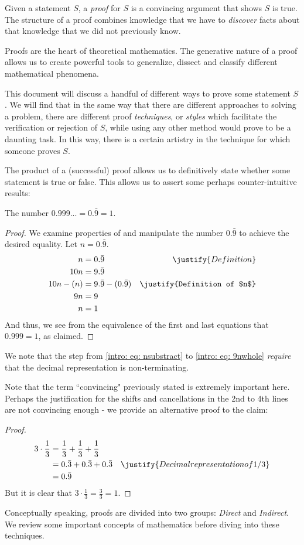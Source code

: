 \documentclass[../proofs.tex]{subfiles}
\begin{document}
Given a statement $S$, a \emph{proof} for $S$ is a convincing argument that shows $S$ is true.
The structure of a proof combines knowledge that we have to \emph{discover} facts about that knowledge
that we did not previously know.

Proofs are the heart of theoretical mathematics. The generative nature of a proof
allows us to create powerful tools to generalize, dissect and classify different
mathematical phenomena.

This document will discuss a handful of different ways to prove some statement $S$.
We will find that in the same way that there are different approaches to solving a
problem, there are different proof \emph{techniques}, or \emph{styles} which
facilitate the verification or rejection of $S$, while using any other method would
prove to be a daunting task. In this way, there is a certain artistry in the
technique for which someone proves $S$.

The product of a (successful) proof allows us to definitively state whether some
statement is true or false. This allows us to assert some perhaps counter-intuitive results:
\begin{claim}
  The number $0.999... = 0.\bar{9} = 1$.
  \begin{proof}
    We examine properties of and manipulate the number $0.\bar{9}$ to achieve the desired
    equality. Let $n = 0.\bar{9}$.
    \begin{align}
       n  &= 0.\bar{9} & \justify{Definition}                             \\
       10n &= 9.\bar{9}   											                          \\
       10n - (n) &= 9.\bar{9} - (0.\bar{9}) & \justify{Definition of $n$} \label{intro: eq: nsubstract} \\
       9n &= 9                                                            \label{intro: eq: 9nwhole}\\
        n &= 1
    \end{align}
    And thus, we see from the equivalence of the first and last equations that $0.999 = 1$, as claimed.
  \end{proof}
\end{claim}
We note that the step from \ref{intro: eq: nsubstract} to \ref{intro: eq: 9nwhole} \emph{require} that the decimal representation is non-terminating.


Note that the term ``convincing" previously stated is extremely important here.
Perhaps the justification for the shifts and cancellations in the 2nd to 4th lines
are not convincing enough - we provide an alternative proof to the claim:
\begin{proof}
  \begin{align}
    3 \cdot \frac{1}{3} &= \frac{1}{3} + \frac{1}{3} + \frac{1}{3} \\
                        &= 0.\bar{3} + 0.\bar{3} + 0.\bar{3} & \justify{Decimal representation of 1/3} \\
                        &= 0.\bar{9}
  \end{align}
  But it is clear that $3 \cdot \frac{1}{3} = \frac{3}{3} = 1$.
\end{proof}

Conceptually speaking, proofs are divided into two groups: \emph{Direct} and \emph{Indirect}.
We review some important concepts of mathematics before diving into these techniques.
\end{document}
